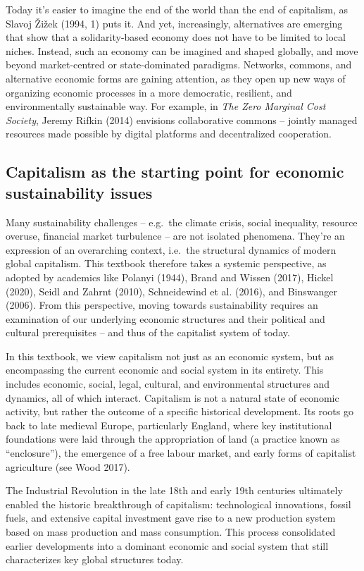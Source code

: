 \documentclass[
  a4paper,
  DIV=11,
  numbers=noendperiod,
  oneside,
  openany]{scrreprt}
\begin{document}
Today it's easier to imagine the end of the world than the end of
capitalism, as Slavoj Žižek (1994, 1) puts it. And yet, increasingly,
alternatives are emerging that show that a solidarity-based economy does
not have to be limited to local niches. Instead, such an economy can be
imagined and shaped globally, and move beyond market-centred or
state-dominated paradigms. Networks, commons, and alternative economic
forms are gaining attention, as they open up new ways of organizing
economic processes in a more democratic, resilient, and environmentally
sustainable way. For example, in \emph{The Zero Marginal Cost Society},
Jeremy Rifkin (2014) envisions collaborative commons -- jointly managed
resources made possible by digital platforms and decentralized
cooperation.

\subsection{Capitalism as the starting point for economic sustainability
issues}\label{capitalism-as-the-starting-point-for-economic-sustainability-issues}

Many sustainability challenges -- e.g.~the climate crisis, social
inequality, resource overuse, financial market turbulence -- are not
isolated phenomena. They're an expression of an overarching context,
i.e.~the structural dynamics of modern global capitalism. This textbook
therefore takes a systemic perspective, as adopted by academics like
Polanyi (1944), Brand and Wissen (2017), Hickel (2020), Seidl and Zahrnt
(2010), Schneidewind et al. (2016), and Binswanger (2006). From this
perspective, moving towards sustainability requires an examination of
our underlying economic structures and their political and cultural
prerequisites -- and thus of the capitalist system of today.

In this textbook, we view capitalism not just as an economic system, but
as encompassing the current economic and social system in its entirety.
This includes economic, social, legal, cultural, and environmental
structures and dynamics, all of which interact. Capitalism is not a
natural state of economic activity, but rather the outcome of a specific
historical development. Its roots go back to late medieval Europe,
particularly England, where key institutional foundations were laid
through the appropriation of land (a practice known as ``enclosure''),
the emergence of a free labour market, and early forms of capitalist
agriculture (see Wood 2017).

The Industrial Revolution in the late 18th and early 19th centuries
ultimately enabled the historic breakthrough of capitalism:
technological innovations, fossil fuels, and extensive capital
investment gave rise to a new production system based on mass production
and mass consumption. This process consolidated earlier developments
into a dominant economic and social system that still characterizes key
global structures today.
\end{document}
